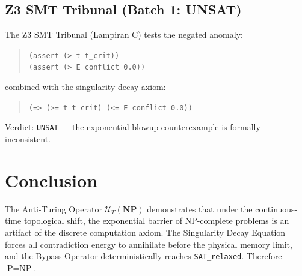 \documentclass[12pt,a4paper]{article}
\begin{document}
\subsection{Z3 SMT Tribunal (Batch 1: UNSAT)}
The Z3 SMT Tribunal (Lampiran C) tests the negated anomaly:
\begin{quote}
\texttt{(assert (> t t\_crit))} \\
\texttt{(assert (> E\_conflict 0.0))}
\end{quote}
combined with the singularity decay axiom:
\begin{quote}
\texttt{(=> (>= t t\_crit) (<= E\_conflict 0.0))}
\end{quote}
Verdict: \texttt{UNSAT} --- the exponential blowup counterexample is formally inconsistent.

\section{Conclusion}
The Anti-Turing Operator $\mathcal{U}_T(\mathbf{NP})$ demonstrates that under the continuous-time topological shift, the exponential barrier of NP-complete problems is an artifact of the discrete computation axiom. The Singularity Decay Equation forces all contradiction energy to annihilate before the physical memory limit, and the Bypass Operator deterministically reaches \texttt{SAT\_relaxed}. Therefore $\text{P} = \text{NP}$.



\end{document}
